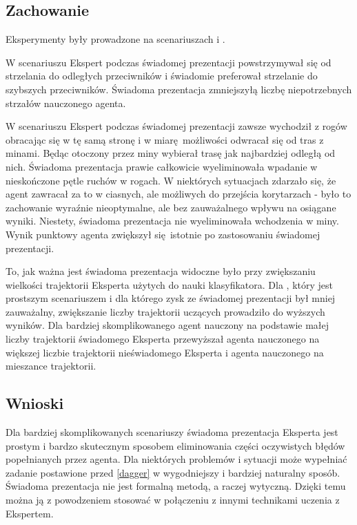 \subsection{Zachowanie}
Eksperymenty były prowadzone na scenariuszach  i .

W scenariuszu  Ekspert podczas świadomej prezentacji powstrzymywał się od strzelania do odległych przeciwników i świadomie preferował strzelanie do szybszych przeciwników. Świadoma prezentacja zmniejszyłą liczbę niepotrzebnych strzałów nauczonego agenta.

W scenariuszu  Ekspert podczas świadomej prezentacji zawsze wychodził z rogów obracając się w tę samą stronę i w miarę możliwości odwracał się od tras z minami. Będąc otoczony przez miny wybierał trasę jak najbardziej odległą od nich. Świadoma prezentacja prawie całkowicie wyeliminowała wpadanie w nieskończone pętle ruchów w rogach. W niektórych sytuacjach zdarzało się, że agent zawracał za to w ciasnych, ale możliwych do przejścia korytarzach - było to zachowanie wyraźnie nieoptymalne, ale bez zauważalnego wpływu na osiągane wyniki. Niestety, świadoma prezentacja nie wyeliminowała wchodzenia w miny. Wynik punktowy agenta zwiększył się istotnie po zastosowaniu świadomej prezentacji.

To, jak ważna jest świadoma prezentacja widoczne było przy zwiększaniu wielkości trajektorii Eksperta użytych do nauki klasyfikatora. Dla , który jest prostszym scenariuszem i dla którego zysk ze świadomej prezentacji był mniej zauważalny, zwiększanie liczby trajektorii uczących prowadziło do wyższych wyników. Dla bardziej skomplikowanego  agent nauczony na podstawie małej liczby trajektorii świadomego Eksperta przewyższał agenta nauczonego na większej liczbie trajektorii nieświadomego Eksperta i agenta nauczonego na mieszance trajektorii. 
 
\subsection{Wnioski}

Dla bardziej skomplikowanych scenariuszy świadoma prezentacja Eksperta jest prostym i bardzo skutecznym sposobem eliminowania części oczywistych błędów popełnianych przez agenta. Dla niektórych problemów i sytuacji może wypełniać zadanie postawione przed \ref{dagger} w wygodniejszy i bardziej naturalny sposób.
Świadoma prezentacja nie jest formalną metodą, a raczej wytyczną. Dzięki temu można ją z powodzeniem stosować w połączeniu z innymi technikami uczenia z Ekspertem.
